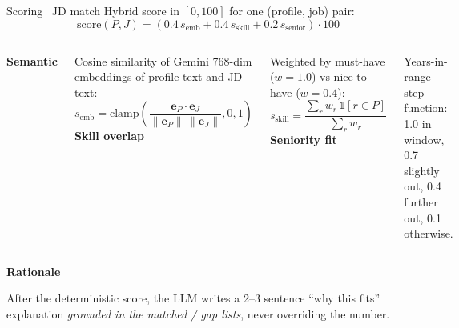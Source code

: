 \documentclass[aspectratio=169,10pt]{beamer}
\newcommand{\biglabel}[1]{\textcolor{brand}{\bfseries\large #1}}
\begin{document}
\begin{frame}{Scoring \textbullet\ JD match}
  \vspace{0.2cm}
  \footnotesize
  Hybrid score in $[0, 100]$ for one (profile, job) pair:
  \[
    \mathrm{score}(P, J) = (0.4\,s_{\text{emb}} + 0.4\,s_{\text{skill}} + 0.2\,s_{\text{senior}}) \cdot 100
  \]

  \vspace{0.4em}
  \begin{columns}[T,onlytextwidth]
      \biglabel{Semantic}\par\smallskip
      \footnotesize Cosine similarity of Gemini 768-dim embeddings of
      profile-text and JD-text:
      \[
        s_{\text{emb}} = \mathrm{clamp}\!\left(\frac{\mathbf{e}_P \cdot \mathbf{e}_J}{\lVert \mathbf{e}_P\rVert\,\lVert\mathbf{e}_J\rVert}, 0, 1\right)
      \]
      \biglabel{Skill overlap}\par\smallskip
      \footnotesize Weighted by must-have ($w{=}1.0$) vs nice-to-have ($w{=}0.4$):
      \[
        s_{\text{skill}} = \frac{\sum_r w_r\,\mathbb{1}[r \in P]}{\sum_r w_r}
      \]
      \biglabel{Seniority fit}\par\smallskip
      \footnotesize Years-in-range step function: 1.0 in window, 0.7
      slightly out, 0.4 further out, 0.1 otherwise.
  \end{columns}

  \vspace{0.8em}
  \biglabel{Rationale}\par\smallskip
  \footnotesize
  After the deterministic score, the LLM writes a 2--3 sentence
  ``why this fits'' explanation \emph{grounded in the matched / gap
  lists}, never overriding the number.
\end{frame}
\end{document}
